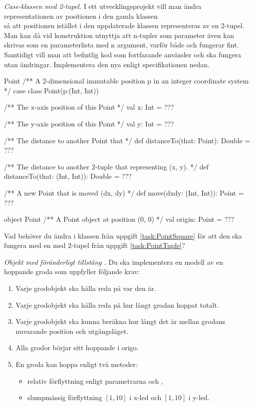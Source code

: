 \Task \label{task:PointTuple} \emph{Case-klassen  med 2-tupel.} I ett utvecklingsprojekt vill man ändra representationen av positionen i den gamla klassen  \\  så att positionen istället i den uppdaterade klassen representeras av en 2-tupel. Man kan då vid konstruktion utnyttja att n-tupler som parameter även kan skrivas som en parameterlista med n argument, varför både  och  fungerar fint. Samtidigt vill man att befintlig kod som fortfarande använder  och  ska fungera utan ändringar.  Implementera den nya  enligt specifikationen nedan.
\begin{ScalaSpec}{Point}
/** A 2-dimensional immutable position p in an integer coordinate system */
case class Point(p:(Int, Int)) {
  /** The x-axis position of this Point */
  val x: Int = ???

  /** The y-axis position of this Point */
  val y: Int = ???

  /** The distance to another Point that */
  def distanceTo(that: Point): Double = ???

  /** The distance to another 2-tuple that representing (x, y). */
  def distanceTo(that: (Int, Int)): Double = ???

  /** A new Point that is moved (dx, dy) */
  def move(dxdy: (Int, Int)): Point = ???
}

object Point {
  /** A Point object at position (0, 0) */
  val origin: Point = ???
}
\end{ScalaSpec}

\Task\Pen Vad behöver du ändra i klassen  från uppgift \ref{task:PointSquare} för att den ska fungera med en  med 2-tupel från uppgift \ref{task:PointTuple}?

\Task \emph{Objekt med föränderligt tillstång .} Du ska implementera en modell av en hoppande groda som uppfyller följande krav:
\begin{enumerate}
\item Varje grodobjekt ska hålla reda på var den är.
\item Varje grodobjekt ska hålla reda på hur långt grodan hoppat totalt.
\item Varje grodobjekt ska kunna beräkna hur långt det är mellan grodans nuvarande position och utgångsläget.
\item Alla grodor börjar sitt hoppande i origo.
\item En groda kan hoppa enligt två metoder:
  \begin{itemize} [nolistsep, noitemsep]
  \item relativ förflyttning enligt parametrarna  och ,
  \item slumpmässig förflyttning $[1, 10]$ i x-led och $[1, 10]$ i y-led.
  \end{itemize}
\end{enumerate}

